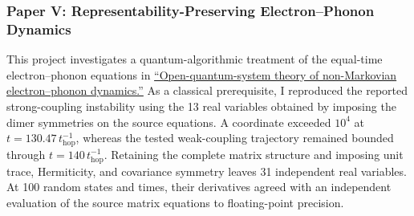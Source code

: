 \documentclass[11pt]{article}
\begin{document}
\clearpage
\subsubsection*{Paper V: Representability-Preserving Electron--Phonon Dynamics}
This project investigates a quantum-algorithmic treatment of the equal-time electron--phonon equations in \href{https://arxiv.org/abs/2606.22233}{``Open-quantum-system theory of non-Markovian electron--phonon dynamics.''} As a classical prerequisite, I reproduced the reported strong-coupling instability using the 13 real variables obtained by imposing the dimer symmetries on the source equations. A coordinate exceeded \(10^4\) at \(t=130.47\,t_{\mathrm{hop}}^{-1}\), whereas the tested weak-coupling trajectory remained bounded through \(t=140\,t_{\mathrm{hop}}^{-1}\). Retaining the complete matrix structure and imposing unit trace, Hermiticity, and covariance symmetry leaves 31 independent real variables. At 100 random states and times, their derivatives agreed with an independent evaluation of the source matrix equations to floating-point precision.
\end{document}
